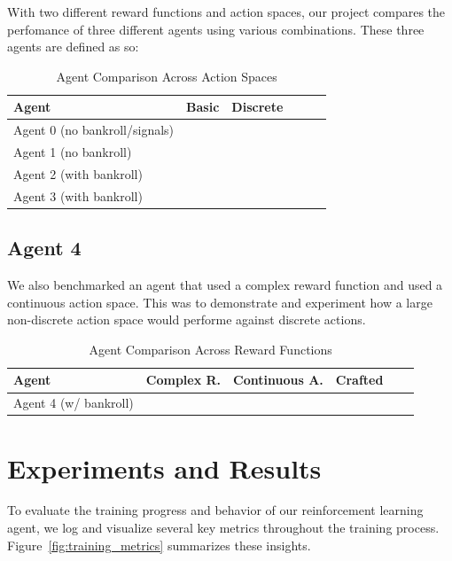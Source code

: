 \documentclass[sigconf]{acmart}
\newcommand{\cmark}{\ding{51}}  %
\begin{document}
With two different reward functions and action spaces, our project compares the perfomance of three different agents using various combinations. These three agents are defined as so: 


\begin{table}[h]
  \caption{Agent Comparison Across Action Spaces}
  \label{tab:agent_benchmarks}
  \begin{tabular}{lccccc}
    \toprule
    \textbf{Agent} & \textbf{Basic} & \textbf{Discrete} \\
    \midrule
    Agent 0 (no bankroll/signals)     & \cmark  &         \\
    Agent 1 (no bankroll)               & \cmark  &         \\
    Agent 2 (with bankroll)             & \cmark  &         \\
    Agent 3 (with bankroll)             &         & \cmark  \\
    \bottomrule
  \end{tabular}
\end{table}

\subsection{Agent 4}

We also benchmarked an agent that used a complex reward function and used a continuous action space. This was to demonstrate and experiment how a large non-discrete action space would performe against discrete actions.

\begin{table}[h]
  \caption{Agent Comparison Across Reward Functions}
  \label{tab:agent_benchmarks}
  \begin{tabular}{lccccc}
    \toprule
    \textbf{Agent} & \textbf{Complex R.} & \textbf{Continuous A.} & \textbf{Crafted} \\
    \midrule
    Agent 4 (w/ bankroll)   & \cmark        & \cmark & \cmark\\
    \bottomrule
  \end{tabular}
\end{table}

\bigskip
\section{Experiments and Results}

To evaluate the training progress and behavior of our reinforcement learning agent, we log and visualize several key metrics throughout the training process. Figure~\ref{fig:training_metrics} summarizes these insights.
\end{document}
